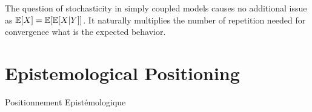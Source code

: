 
The question of stochasticity in simply coupled models causes no additional issue as $\operatorname{\mathbb{E}}\!\left[X\right]=\operatorname{\mathbb{E}}\!\left[\operatorname{\mathbb{E}}\!\left[X|Y\right]\right]$. It naturally multiplies the number of repetition needed for convergence what is the expected behavior.










\newpage




\section{Epistemological Positioning}{Positionnement Epistémologique}\label{sec:epistemo-position}















